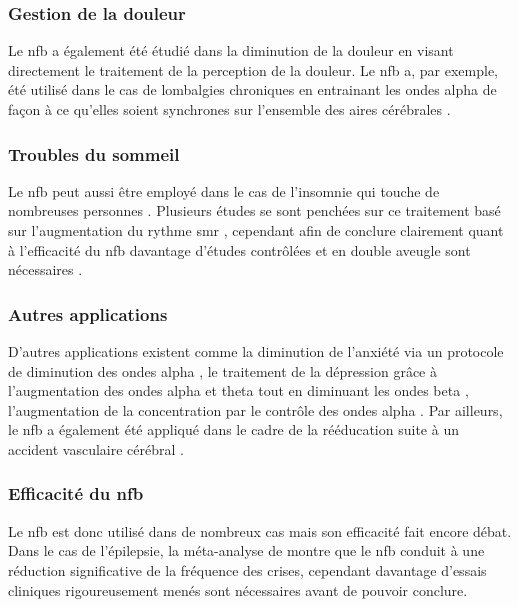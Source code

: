 \subsubsection{Gestion de la douleur}

Le \gls{nfb} a également été étudié dans la diminution de la douleur en visant directement le traitement de la perception de la douleur. Le \gls{nfb} a, par
exemple, été utilisé dans le cas de lombalgies chroniques en entrainant les ondes alpha de façon à ce qu'elles soient synchrones sur l'ensemble des aires 
cérébrales \citep{Mcknight2001, Thapa2018, Mayaud2019}.

\subsubsection{Troubles du sommeil}
Le \gls{nfb} peut aussi être employé dans le cas de l'insomnie qui touche de nombreuses personnes \citep{Marzbani2016}. Plusieurs études se sont penchées sur ce traitement
basé sur l'augmentation du rythme \gls{smr} \citep{Schabus2014, Schabus2017}, cependant afin de conclure clairement quant à l'efficacité du \gls{nfb} davantage 
d'études contrôlées et en double aveugle sont nécessaires \citep{Micoulaud2019sommeil}. 

\subsubsection{Autres applications}

D'autres applications existent comme la diminution de l'anxiété via un protocole de diminution des ondes alpha \citep{Budzynski2009}, le traitement de la dépression
grâce à l'augmentation des ondes alpha et theta tout en diminuant les ondes beta \citep{Hurt2014}, l'augmentation de la concentration par le contrôle des ondes
alpha \citep{Babiloni2008, Berka2010}. Par ailleurs, le \gls{nfb} a également été appliqué dans le cadre de la rééducation suite à un accident vasculaire cérébral \citep{Biasiucci2018,
Cervera2018}. 

\subsubsection{Efficacité du \gls{nfb}}
 
Le \gls{nfb} est donc utilisé dans de nombreux cas mais son efficacité fait encore débat. Dans le cas de l'épilepsie, la méta-analyse de \citet{Tan2009}
montre que le \gls{nfb} conduit à une réduction significative de la fréquence des crises, cependant davantage d'essais cliniques
rigoureusement menés sont nécessaires avant de pouvoir conclure. 

